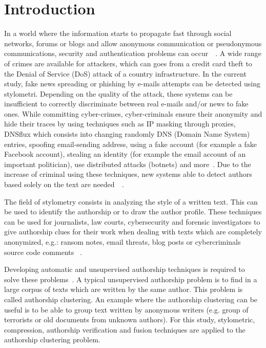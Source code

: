 
\chapter{Introduction \label{sec:introduction}}

In a world where the information starts to propagate fast through social networks, forums or blogs and allow anonymous communication or pseudonymous communications, security and authentication problems can occur~\cite{automated_unsupervised}~\cite{kocher_pan16}.
A wide range of crimes are available for attackers, which can goes from a credit card theft to the Denial of Service (DoS) attack of a country infrastructure.
In the current study, fake news spreading or phishing by e-mails attempts can be detected using stylometri.
Depending on the quality of the attack, these systems can be insufficient to correctly discriminate between real e-mails and/or news to fake ones.
While committing cyber-crimes, cyber-criminals ensure their anonymity and hide their traces by using techniques such as IP masking through proxies, DNSflux which consists into changing randomly DNS (Domain Name System) entries, spoofing email-sending address, using a fake account (for example a fake Facebook account), stealing an identity (for example the email account of an important politician), use distributed attacks (botnets) and more~\cite{attribution_in_cyberspace}.
Due to the increase of criminal using these techniques, new systems able to detect authors based solely on the text are needed~\cite{automated_unsupervised}~\cite{unine_pan20_fake_news}.

The field of stylometry consists in analyzing the style of a written text.
This can be used to identify the authorship or to draw the author profile.
These techniques can be used for journalists, law courts, cybersecurity and forensic investigators to give authorship clues for their work when dealing with texts which are completely anonymized, e.g.: ransom notes, email threats, blog posts or cybercriminals source code comments ~\cite{pan16_clustering_site}.

Developing automatic and unsupervised authorship techniques is required to solve these problems~\cite{automated_unsupervised}.
A typical unsupervised authorship problem is to find in a large corpus of texts which are written by the same author.
This problem is called authorship clustering.
An example where the authorship clustering can be useful is to be able to group text written by anonymous writers (e.g. group of terrorists or old documents from unknown authors).
For this study, stylometric, compression, authorship verification and fusion techniques are applied to the authorship clustering problem.





